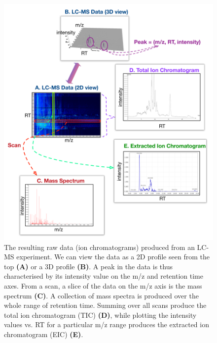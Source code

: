 \begin{figure}
\noindent \begin{centering}
\includegraphics[width=1.0\textwidth]{02-background/figures/spectra.pdf}
\par\end{centering}
\caption[The resulting data produced from an LC-MS experiment.]{\label{fig:LC-MS-data}The resulting raw data (ion chromatograms) produced from an LC-MS experiment. We can view the data as a 2D profile seen from the top \textbf{(A)} or a 3D profile \textbf{(B)}. A peak in the data is thus characterised by its intensity value on the m/z and retention time axes. From a scan, a slice of the data on the m/z axis is the mass spectrum \textbf{(C)}. A collection of mass spectra is produced over the whole range of retention time. Summing over all scans produce the total ion chromatogram (TIC) \textbf{(D)}, while plotting the intensity values vs. RT for a particular m/z range produces the extracted ion chromatogram (EIC) \textbf{(E)}.}
\end{figure}

